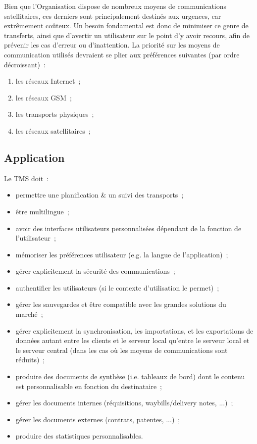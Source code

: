 \begin{constraint}
Bien que l'Organisation dispose de nombreux moyens de communications satellitaires, ces derniers sont principalement destinés aux urgences, car extrêmement coûteux. Un besoin fondamental est donc de minimiser ce genre de transferts, ainsi que d'avertir un utilisateur sur le point d'y avoir recours, afin de prévenir les cas d'erreur ou d'inattention.
La priorité sur les moyens de communication utilisés devraient se plier aux préférences suivantes (par ordre décroissant)~:
\begin{enumerate}
	\item les réseaux Internet~;
	\item les réseaux GSM~;
	\item les transports physiques~;
	\item les réseaux satellitaires~;
\end{enumerate}
\end{constraint}

\subsection{Application}
Le TMS doit~:
\begin{itemize}
	\item permettre une planification \& un suivi des transports~;
	\item être multilingue~;
	\item avoir des interfaces utilisateurs personnalisées dépendant de la fonction de l'utilisateur~;
	\item mémoriser les préférences utilisateur (e.g. la langue de l'application)~;
	\item gérer explicitement la sécurité des communications~;
	\item authentifier les utilisateurs (si le contexte d'utilisation le permet)~;
	\item gérer les sauvegardes et être compatible avec les grandes solutions du marché~;
	\item gérer explicitement la synchronisation, les importations, et les exportations de données autant entre les clients et le serveur local qu'entre le serveur local et le serveur central (dans les cas où les moyens de communications sont réduits)~;
	\item produire des documents de synthèse (i.e. tableaux de bord) dont le contenu est personnalisable en fonction du destinataire~;
	\item gérer les documents internes (réquisitions, waybills/delivery notes, ...)~;
	\item gérer les documents externes (contrats, patentes, ...)~;
	\item produire des statistiques personnalisables.
\end{itemize}
